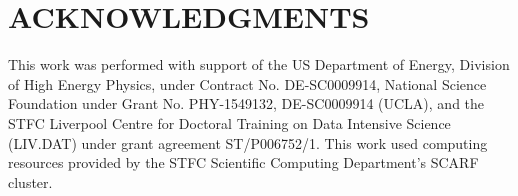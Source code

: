 \documentclass{aac}
\begin{document}
\section{ACKNOWLEDGMENTS}

This work was performed with support of the US Department of Energy, Division of High Energy Physics, under Contract No. DE-SC0009914, National Science Foundation under Grant No. PHY-1549132, DE-SC0009914 (UCLA), and the STFC Liverpool Centre for Doctoral Training on Data Intensive Science (LIV.DAT) under grant agreement ST/P006752/1. This work used computing resources provided by the STFC Scientific Computing Department’s SCARF cluster.

\nocite{*}
%
%
\end{document}
